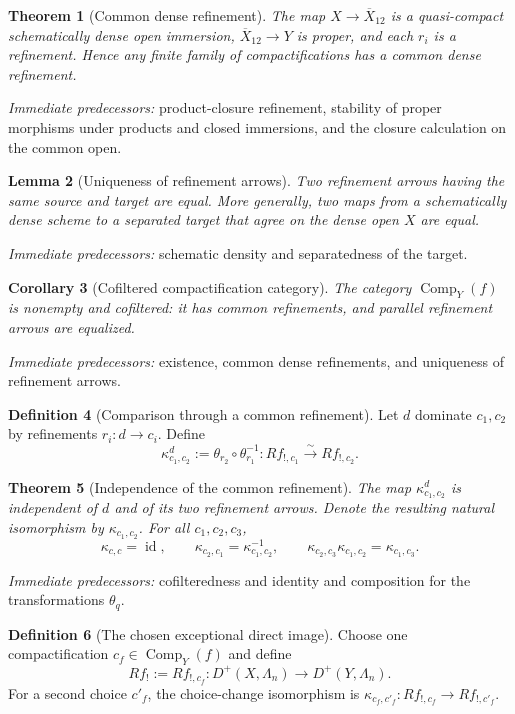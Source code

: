 \documentclass[10pt]{article}
\newtheorem{theorem}{Theorem}[section]
\newtheorem{corollary}[theorem]{Corollary}
\newtheorem{lemma}[theorem]{Lemma}
\theoremstyle{definition}
\newtheorem{definition}[theorem]{Definition}
\newcommand{\Comp}{\operatorname{Comp}}
\newcommand{\pred}[1]{\par\smallskip\begingroup\footnotesize\raggedright
\emph{Immediate predecessors:} #1.\par\endgroup}
\begin{document}
\begin{theorem}[Common dense refinement]
The map \(X\to\overline X_{12}\) is a quasi-compact schematically dense open
immersion, \(\overline X_{12}\to Y\) is proper, and each \(r_i\) is a
refinement.  Hence any finite family of compactifications has a common dense
refinement.
\end{theorem}
\pred{product-closure refinement, stability of proper morphisms under products and closed immersions, and the closure calculation on the common open}

\begin{lemma}[Uniqueness of refinement arrows]
Two refinement arrows having the same source and target are equal.  More
generally, two maps from a schematically dense scheme to a separated target
that agree on the dense open \(X\) are equal.
\end{lemma}
\pred{schematic density and separatedness of the target}

\begin{corollary}[Cofiltered compactification category]
The category \(\Comp_Y(f)\) is nonempty and cofiltered: it has common
refinements, and parallel refinement arrows are equalized.
\end{corollary}
\pred{existence, common dense refinements, and uniqueness of refinement arrows}

\begin{definition}[Comparison through a common refinement]
Let \(d\) dominate \(c_1,c_2\) by refinements \(r_i:d\to c_i\).  Define
\[
 \kappa^{d}_{c_1,c_2}:=
 \theta_{r_2}\circ\theta_{r_1}^{-1}:
 Rf_{!,c_1}\xrightarrow{\sim}Rf_{!,c_2}.
\]
\end{definition}

\begin{theorem}[Independence of the common refinement]
The map \(\kappa^{d}_{c_1,c_2}\) is independent of \(d\) and of its two
refinement arrows.  Denote the resulting natural isomorphism by
\(\kappa_{c_1,c_2}\).  For all \(c_1,c_2,c_3\),
\[
 \kappa_{c,c}=\operatorname{id},\qquad
 \kappa_{c_2,c_1}=\kappa_{c_1,c_2}^{-1},\qquad
 \kappa_{c_2,c_3}\kappa_{c_1,c_2}=\kappa_{c_1,c_3}.
\]
\end{theorem}
\pred{cofilteredness and identity and composition for the transformations \(\theta_q\)}

\begin{definition}[The chosen exceptional direct image]
Choose one compactification \(c_f\in\Comp_Y(f)\) and define
\[
 Rf_!:=Rf_{!,c_f}:
 D^+(X,\Lambda_n)\longrightarrow D^+(Y,\Lambda_n).
\]
For a second choice \(c'_f\), the choice-change isomorphism is
\(\kappa_{c_f,c'_f}:Rf_{!,c_f}\to Rf_{!,c'_f}\).
\end{definition}
\end{document}
